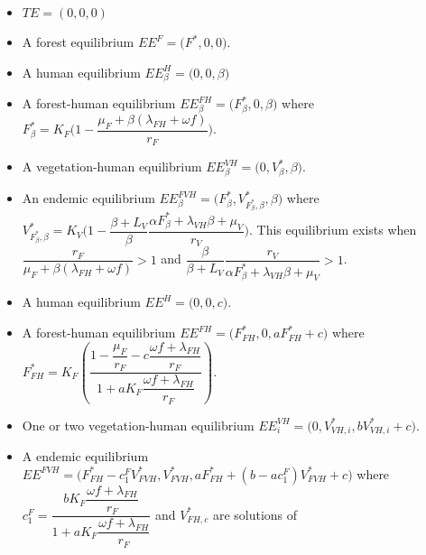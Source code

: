 \documentclass{article}
\newcommand{\lf}{\lambda_{FH}}
\newcommand{\lv}{\lambda_{VH}}
\newcommand{\Fbeta}{F^*_\beta}
\newcommand{\VbetaF}{V^*_{\Fbeta, \beta}}
\newcommand{\FHterme}{\omega f + \lf}
\begin{document}
\begin{itemize}
\item $TE = (0,0,0)$
\item A forest equilibrium $EE^F = \Big(F^*, 0, 0 \Big) $.
\item A human equilibrium $EE^H_\beta = \Big(0,0,\beta \Big)$
\item A forest-human equilibrium $EE^{FH}_\beta = \Big(F^*_\beta, 0, \beta\Big)$ where $F^*_\beta = K_F \Big(1-\dfrac{\mu_F + \beta(\lf + \omega f)}{r_F} \Big)$.
\item A vegetation-human equilibrium $EE^{VH}_\beta = \Big(0, V^*_{\beta}, \beta \Big)$.
\item An endemic equilibrium $EE_\beta^{FVH} = \Big(F^*_\beta, V^*_{F^*_\beta, \beta}, \beta \Big)$ where $\VbetaF = K_V \Big(1- \dfrac{\beta +L_V}{\beta} \dfrac{\alpha \Fbeta + \lv \beta + \mu_V}{r_V} \Big)$. This equilibrium exists  when $\dfrac{r_F}{\mu_F + \beta(\lf + \omega f)} > 1$ and $\dfrac{\beta}{\beta + L_V} \dfrac{r_V}{\alpha \Fbeta + \lv \beta + \mu_V} > 1$.


\item A human equilibrium $EE^H = \Big(0,0,c\Big)$.
\item A forest-human equilibrium $EE^{FH} = \Big(F^*_{FH}, 0, a F^*_{FH} + c \Big)$ where $F^*_{FH} = K_F \left( \dfrac{1 - \dfrac{\mu_F}{r_F} - c \dfrac{\omega f + \lf}{r_F}}{1 + a K_F \dfrac{\omega f + \lf}{r_F}} \right)$.
\item One or two vegetation-human equilibrium $EE^{VH}_i = \Big(0, V^*_{VH, i}, bV^*_{VH, i}+c \Big)$.
\item A endemic equilibrium $EE^{FVH} = \Big(F^*_{FH} - c_1^FV^*_{FVH}, V^*_{FVH}, aF^*_{FH}+(b-ac_1^F)V^*_{FVH}+c \Big)$ where $c^F_1 = \dfrac{bK_F \dfrac{\FHterme}{r_F} }{1 + aK_F \dfrac{\FHterme}{r_F}}$
and $V^*_{FH, c}$ are solutions of 
\end{itemize}
\end{document}
